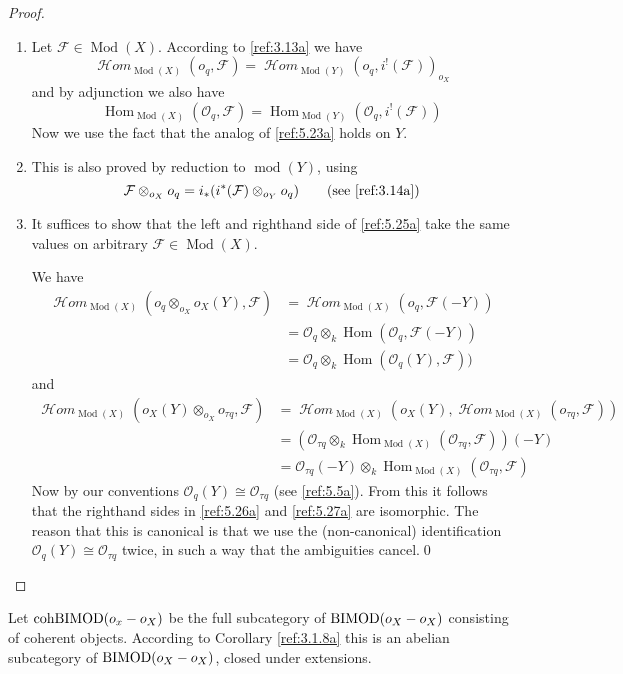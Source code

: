 \documentclass{amsproc}
\def\Fscr{{\mathcal F}}
\def\Hscr{{\mathcal H}}
\def\Oscr{{\mathcal O}}
\def\HHom{\operatorname {\Hscr \mathit{om}}}
\def\BIMOD{\mathop{\text{BIMOD}}}
\def\cohBIMOD{\mathop{\text{cohBIMOD}}}
\def\Hom{\operatorname {Hom}}
\def\HHom{\operatorname {\Hscr \mathit{om}}}
\def\coh{\operatorname {mod}}
\def\Qch{\operatorname {Mod}}
\let\oldtext\text
\def\text#1{\oldtext{\upshape #1}}
\theoremstyle{definition}
\theoremstyle{remark}
\numberwithin{equation}{section}
\numberwithin{table}{section}
\numberwithin{figure}{section}
\begin{document}
\begin{proof}
\begin{enumerate}
\item Let $\Fscr\in \Qch(X)$. 
According to  \eqref{ref:3.13a} we have
\[
\HHom_{\Qch(X)}(o_q,\Fscr)=\HHom_{\Qch(Y)}(o_q,i^!(\Fscr))_{o_X}
\]
and by adjunction we also have
\[
\Hom_{\Qch(X)}(\Oscr_q,\Fscr)=\Hom_{\Qch(Y)}(\Oscr_q,i^!(\Fscr))
\]
Now we use the fact that  the analog of \eqref{ref:5.23a}
 holds on $Y$.
\item
This is also proved by reduction to $\coh(Y)$, using
\[
\Fscr\otimes_{o_X} o_q=i_\ast(i^\ast(\Fscr)\otimes_{o_Y} o_q)\qquad
\text{(see \eqref{ref:3.14a})}
\]
\item
It suffices to show that the left and righthand side of \eqref{ref:5.25a}
take the same values on arbitrary $\Fscr\in \Qch(X)$.

We have
\begin{equation}
\begin{split}
\label{ref:5.26a}
\HHom_{\Qch(X)}(o_q\otimes_{o_X} o_X(Y),\Fscr)&=
\HHom_{\Qch(X)}(o_q,\Fscr(-Y))\\
&=\Oscr_q\otimes_k \Hom(\Oscr_q,\Fscr(-Y))\\
&=\Oscr_q\otimes_k \Hom(\Oscr_q(Y),\Fscr))
\end{split}
\end{equation}
and
\begin{equation}
\label{ref:5.27a}
\begin{split}
\HHom_{\Qch(X)}(o_X(Y)\otimes_{o_X} o_{\tau q},\Fscr)
&=\HHom_{\Qch(X)}(o_X(Y),\HHom_{\Qch(X)}(o_{\tau q},\Fscr))\\
&=(\Oscr_{\tau q}\otimes_k \Hom_{\Qch(X)}(\Oscr_{\tau q},\Fscr))(-Y)\\
&=\Oscr_{\tau q}(-Y)\otimes_k \Hom_{\Qch(X)}(\Oscr_{\tau q},\Fscr)
\end{split}
\end{equation}
Now by our conventions $\Oscr_q(Y)\cong \Oscr_{\tau q}$ (see
\eqref{ref:5.5a}). From this it follows that the righthand sides in
\eqref{ref:5.26a} and \eqref{ref:5.27a} are isomorphic.  The reason
that this is canonical is that we use the (non-canonical) identification
$\Oscr_q(Y)\cong\Oscr_{\tau q}$ twice, in such a way that the
ambiguities cancel.\qed
\end{enumerate}
\def\qed{} \end{proof}
Let $\cohBIMOD(o_x-o_X)$ be the full subcategory of $\BIMOD(o_X-o_X)$
consisting of coherent objects. According to Corollary \ref{ref:3.1.8a} this
is an abelian subcategory of $\BIMOD(o_X-o_X)$, closed under extensions.
\end{document}
